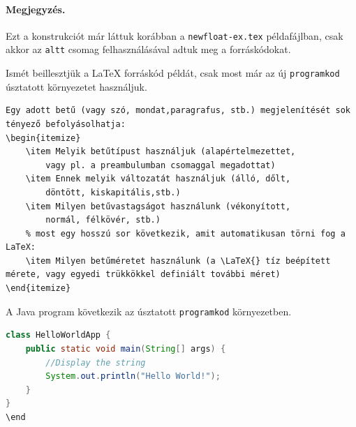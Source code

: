 \documentclass{article}
\begin{document}
\paragraph{Megjegyzés.}
Ezt a konstrukciót már láttuk korábban a \texttt{newfloat-ex.tex} példafájlban, csak akkor az \texttt{altt} csomag felhasználásával adtuk meg a forráskódokat.

Ismét beillesztjük a   \LaTeX{} forráskód példát, csak most már az új \verb!programkod! úsztatott környezetet használjuk.

\begin{programkod}[!h]
{\centering
\begin{lstlisting}[language={[LaTeX]TeX}, frame=TRBL]
% most egy hosszú sor következik, amit automatikusan törni fog a LaTeX:
Egy adott betű (vagy szó, mondat,paragrafus, stb.) megjelenítését sok tényező befolyásolhatja:
\begin{itemize}
	\item Melyik betűtípust használjuk (alapértelmezettet,
		vagy pl. a preambulumban csomaggal megadottat)
	\item Ennek melyik változatát használjuk (álló, dőlt,
		döntött, kiskapitális,stb.)
	\item Milyen betűvastagságot használunk (vékonyított,
		normál, félkövér, stb.)
	% most egy hosszú sor következik, amit automatikusan törni fog a LaTeX:
	\item Milyen betűméretet használunk (a \LaTeX{} tíz beépített mérete, vagy egyedi trükkökkel definiált további méret)
\end{itemize}
\end{lstlisting}
\caption{A \LaTeX{} forráskód példa}
}
\end{programkod}

A Java program következik az úsztatott \verb!programkod! környezetben.
\begin{programkod}[!h]
{\centering
\begin{lstlisting}[language=Java, frame=shadowbox]
class HelloWorldApp {
    public static void main(String[] args) {
        //Display the string
        System.out.println("Hello World!");
    }
}
\end
\end{lstlisting}
\caption{A Java forráskód példa}
}
\end{programkod}

\pagebreak[4]
\end{document}
